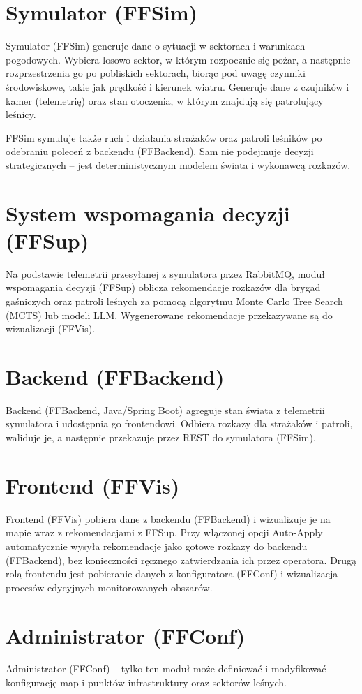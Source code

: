 \documentclass[11pt,a4paper]{article}
\begin{document}
\section*{Symulator (FFSim)}
Symulator (FFSim) generuje dane o sytuacji w sektorach i warunkach pogodowych. Wybiera losowo sektor, w którym rozpocznie się pożar, a następnie rozprzestrzenia go po pobliskich sektorach, biorąc pod uwagę czynniki środowiskowe, takie jak prędkość i kierunek wiatru. Generuje dane z czujników i kamer (telemetrię) oraz stan otoczenia, w którym znajdują się patrolujący leśnicy.

FFSim symuluje także ruch i działania strażaków oraz patroli leśników po odebraniu poleceń z backendu (FFBackend). Sam nie podejmuje decyzji strategicznych -- jest deterministycznym modelem świata i wykonawcą rozkazów.

\section*{System wspomagania decyzji (FFSup)}
Na podstawie telemetrii przesyłanej z symulatora przez RabbitMQ, moduł wspomagania decyzji (FFSup) oblicza rekomendacje rozkazów dla brygad gaśniczych oraz patroli leśnych za pomocą algorytmu Monte Carlo Tree Search (MCTS) lub modeli LLM. Wygenerowane rekomendacje przekazywane są do wizualizacji (FFVis).

\section*{Backend (FFBackend)}
Backend (FFBackend, Java/Spring Boot) agreguje stan świata z telemetrii symulatora i udostępnia go frontendowi. Odbiera rozkazy dla strażaków i patroli, waliduje je, a następnie przekazuje przez REST do symulatora (FFSim).

\section*{Frontend (FFVis)}
Frontend (FFVis) pobiera dane z backendu (FFBackend) i wizualizuje je na mapie wraz z rekomendacjami z FFSup. Przy włączonej opcji Auto-Apply automatycznie wysyła rekomendacje jako gotowe rozkazy do backendu (FFBackend), bez konieczności ręcznego zatwierdzania ich przez operatora. Drugą rolą frontendu jest pobieranie danych z konfiguratora (FFConf) i wizualizacja procesów edycyjnych monitorowanych obszarów.

\section*{Administrator (FFConf)}
Administrator (FFConf) – tylko ten moduł może definiować i modyfikować konfigurację map i punktów infrastruktury oraz sektorów leśnych.  
\end{document}
